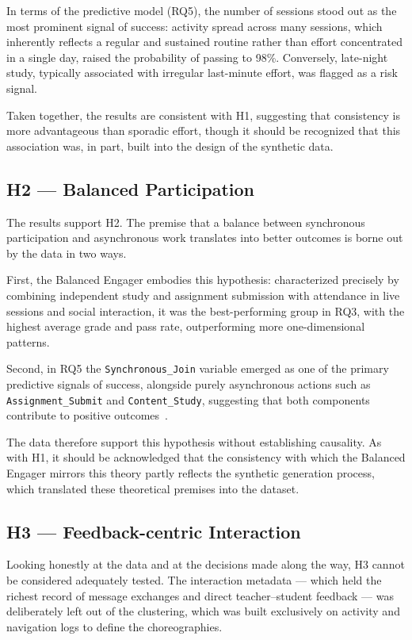 In terms of the predictive model (RQ5), the number of sessions stood out as the most prominent signal of success: activity spread across many sessions, which inherently reflects a regular and sustained routine rather than effort concentrated in a single day, raised the probability of passing to 98\%. Conversely, late-night study, typically associated with irregular last-minute effort, was flagged as a risk signal.

Taken together, the results are consistent with H1, suggesting that consistency is more advantageous than sporadic effort, though it should be recognized that this association was, in part, built into the design of the synthetic data.

\subsection{H2 --- Balanced Participation}

The results support H2. The premise that a balance between synchronous participation and asynchronous work translates into better outcomes is borne out by the data in two ways.

First, the Balanced Engager embodies this hypothesis: characterized precisely by combining independent study and assignment submission with attendance in live sessions and social interaction, it was the best-performing group in RQ3, with the highest average grade and pass rate, outperforming more one-dimensional patterns.

Second, in RQ5 the \texttt{Synchronous\_Join} variable emerged as one of the primary predictive signals of success, alongside purely asynchronous actions such as \texttt{Assignment\_Submit} and \texttt{Content\_Study}, suggesting that both components contribute to positive outcomes~\cite{fostering_curtis_2015}.

The data therefore support this hypothesis without establishing causality. As with H1, it should be acknowledged that the consistency with which the Balanced Engager mirrors this theory partly reflects the synthetic generation process, which translated these theoretical premises into the dataset.

\subsection{H3 --- Feedback-centric Interaction}

Looking honestly at the data and at the decisions made along the way, H3 cannot be considered adequately tested. The interaction metadata --- which held the richest record of message exchanges and direct teacher--student feedback --- was deliberately left out of the clustering, which was built exclusively on activity and navigation logs to define the choreographies.


